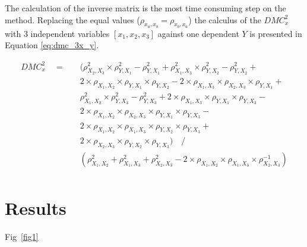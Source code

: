 \documentclass[10pt,letterpaper]{article}
\newcommand{\dmc}{\(DMC_x^2\) }
\begin{document}
The calculation of the inverse matrix is the most time consuming step on the method. Replacing the equal values  (\(\rho_{x_{a},x_{b}} = \rho_{x_{b},x_{a}}\)) the  calculus of the \dmc with 3 independent variables \([x_{1}, x_{2}, x_{3}]\) against one dependent \(Y\) is presented in Equation \ref{eq:dmc_3x_y}.

\begin{equation}\label{eq:dmc_3x_y} 
  \begin{split}
DMC_{x}^{2} \quad = \quad & ( \rho^{2}_{X_{2},X_{3}} \times \rho^{2}_{Y,X_{1}}- \rho^{2}_{Y,X_{1}} + \rho^{2}_{X_{1},X_{3}}\times \rho^{2}_{Y,X_{2}}-\rho^{2}_{Y,X_{2}}+ \\
& 2 \times \rho_{X_{1},X_{2}} \times \rho_{Y,X_{1}} \times \rho_{Y,X_{2}}   - 2 \times \rho_{X_{1},X_{3}} \times \rho_{X_{2},X_{3}} \times \rho_{Y,X_{1}} + \\
& \rho^{2}_{X_{1},X_{2}} \times \rho^{2}_{Y,X_{3}}-\rho^{2}_{Y,X_{3}} + 2 \times \rho_{X_{1},X_{3}} \times \rho_{Y,X_{1}} \times \rho_{Y,X_{3}} - \\ 
& 2 \times \rho_{X_{1},X_{2}} \times \rho_{X_{2},X_{3}} \times \rho_{Y,X_{1}} \times \rho_{Y,X_{3}} - \\
& 2 \times \rho_{X_{1},X_{2}} \times \rho_{X_{1},X_{3}} \times \rho_{Y,X_{2}} \times \rho_{Y,X_{3}} + \\
& 2 \times \rho_{X_{2},X_{3}} \times \rho_{Y,X_{2}} \times \rho_{Y,X_{3}} ) \quad / \\
& ( \rho^{2}_{X_{1},X_{2}} + \rho^{2}_{X_{1},X_{3}} + \rho^{2}_{X_{2},X_{3}} - 2 \times \rho_{X_{1},X_{2}} \times \rho_{X_{1},X_{3}} \times \rho_{X_{2},X_{3}}^{-1}) \\
 \end{split}
\end{equation}



\section*{Results}

Fig~\ref{fig1} 
\end{document}
